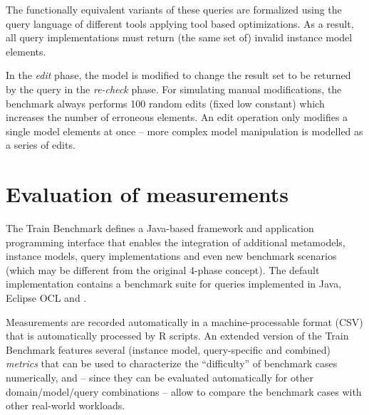 The functionally equivalent variants of these queries are formalized using the
query language of different tools applying tool based optimizations. As a
result, all query implementations must return (the same set of) invalid instance
model elements.
 
In the \emph{edit} phase, the model is modified to change the result set to be
returned by the query in the \emph{re-check} phase. For simulating manual
modifications, the benchmark always performs 100 random edits (fixed low
constant) which increases the number of erroneous elements. An edit operation
only modifies a single model elements at once -- more complex model manipulation is
modelled as a series of edits.

\section{Evaluation of measurements}
The Train Benchmark defines a Java-based framework and application programming
interface that enables the integration of additional metamodels, instance
models, query implementations and even new benchmark scenarios (which may be
different from the original 4-phase concept). The default implementation
contains a benchmark suite for queries implemented in Java, Eclipse OCL and
\incquery{}.

Measurements are recorded automatically in a machine-processable format (CSV)
that is automatically processed by R \cite{TB:R} scripts. An extended version of the Train
Benchmark \cite{TB:ASE2013} features several (instance model, query-specific and
combined) \emph{metrics} that can be used to characterize the ``difficulty'' of
benchmark cases numerically, and -- since they can be evaluated automatically
for other domain/model/query combinations -- allow to compare the benchmark
cases with other real-world workloads.
